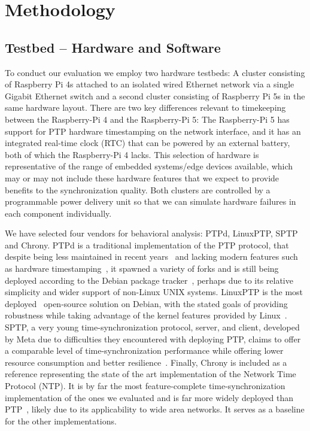 
\section{Methodology}

\subsection{Testbed -- Hardware and Software}

To conduct our evaluation we employ two hardware testbeds: A cluster consisting of Raspberry Pi 4s attached to an isolated wired Ethernet network via a single Gigabit Ethernet switch and a second cluster consisting of Raspberry Pi 5s in the same hardware layout. There are two key differences relevant to timekeeping between the Raspberry-Pi 4 and the Raspberry-Pi 5: The Raspberry-Pi 5 has support for PTP hardware timestamping on the network interface, and it has an integrated real-time clock (RTC) that can be powered by an external battery, both of which the Raspberry-Pi 4 lacks. This selection of hardware is representative of the range of embedded systems/edge devices available, which may or may not include these hardware features that we expect to provide benefits to the synchronization quality. Both clusters are controlled by a programmable power delivery unit so that we can simulate hardware failures in each component individually.

We have selected four vendors for behavioral analysis: PTPd, LinuxPTP, SPTP and Chrony. PTPd is a traditional implementation of the PTP protocol, that despite being less maintained in recent years~\cite{ptpd-maintainers} and lacking modern features such as hardware timestamping~\cite{ptpd-manpage}, it spawned a variety of forks and is still being deployed according to the Debian package tracker~\cite{debian-popularity-contest}, perhaps due to its relative simplicity and wider support of non-Linux UNIX systems. LinuxPTP is the most deployed~\cite{debian-popularity-contest} open-source solution on Debian, with the stated goals of providing robustness while taking advantage of the kernel features provided by Linux~\cite{linuxptp-homepage}. SPTP, a very young time-synchronization protocol, server, and client, developed by Meta due to difficulties they encountered with deploying PTP, claims to offer a comparable level of time-synchronization performance while offering lower resource consumption and better resilience~\cite{facebook-sptp}. Finally, Chrony is included as a reference representing the state of the art implementation of the Network Time Protocol (NTP). It is by far the most feature-complete time-synchronization implementation of the ones we evaluated and is far more widely deployed than PTP~\cite{debian-popularity-contest}, likely due to its applicability to wide area networks. It serves as a baseline for the other implementations.

